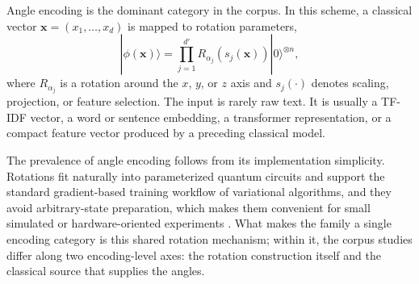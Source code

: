 \documentclass{ieeeaccess}
\begin{document}
Angle encoding is the dominant category in the corpus. In this scheme, a classical vector $\mathbf{x} = (x_1,\ldots,x_d)$ is mapped to rotation parameters,
\begin{equation}
|\phi(\mathbf{x})\rangle =
\prod_{j=1}^{d'} R_{\alpha_j}(s_j(\mathbf{x})) |0\rangle^{\otimes n},
\end{equation}
where $R_{\alpha_j}$ is a rotation around the $x$, $y$, or $z$ axis and $s_j(\cdot)$ denotes scaling, projection, or feature selection. The input is rarely raw text. It is usually a TF-IDF vector, a word or sentence embedding, a transformer representation, or a compact feature vector produced by a preceding classical model.

The prevalence of angle encoding follows from its implementation simplicity. Rotations fit naturally into parameterized quantum circuits and support the standard gradient-based training workflow of variational algorithms, and they avoid arbitrary-state preparation, which makes them convenient for small simulated or hardware-oriented experiments \cite{mitarai2018quantum,schuld2019evaluating}. What makes the family a single encoding category is this shared rotation mechanism; within it, the corpus studies differ along two encoding-level axes: the rotation construction itself and the classical source that supplies the angles. 
\end{document}

